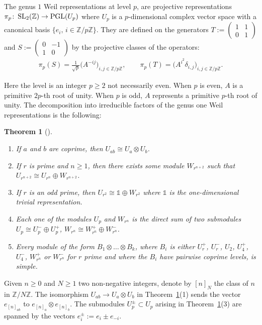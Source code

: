 \documentclass[pdftex]{sigma}
\numberwithin{equation}{section}
\newtheorem{Theorem}{Theorem}[section]
\begin{document}
The genus $1$ Weil representations at level $p$, are projective representations $\pi_p \colon \operatorname{SL}_2(\mathbb{Z}) \rightarrow \operatorname{PGL}(U_p)$ where $U_p$ is a $p$-dimensional complex vector space with a canonical basis $\{e_i, \, i \in \mathbb{Z}/p\mathbb{Z} \}$. They are defined on the generators $T:= \left(\begin{smallmatrix} 1&1\\0&1 \end{smallmatrix}\right)$ and $S:=\left(\begin{smallmatrix} 0& -1 \\ 1&0 \end{smallmatrix}\right)$ by the projective classes of the operators:
 \begin{gather*}
\pi_p (S) = \frac{1}{\sqrt{p}} \big( A^{-ij}\big)_{i,j \in \mathbb{Z}/p\mathbb{Z}},\qquad
\pi_p(T) = \big( A^{i^2}\delta_{i,j} \big)_{i,j \in \mathbb{Z}/p\mathbb{Z}}.
\end{gather*}

 Here the level is an integer $p\geq 2$ not necessarily even. When $p$ is even, $A$ is a primitive $2p$-{th} root of unity. When $p$ is odd, $A$ represents a primitive $p$-{th} root of unity. The decomposition into irreducible factors of the genus one Weil representations is the following:

\begin{Theorem}[{\cite[Theorem ~1.1]{Koju1}}] \label{th_weil}\quad
\begin{enumerate}\itemsep=0pt
\item[$1.$] If $a$ and $b$ are coprime, then $U_{ab}\cong U_a \otimes U_b$.
\item[$2.$] If $r$ is prime and $n\geq 1$, then there exists some module $W_{r^{n+2}}$ such that $U_{r^{n+2}}\cong U_{r^n}\oplus W_{r^{n+2}}$.
\item[$3.$] If $r$ is an odd prime, then $U_{r^2}\cong \mathds{1}\oplus W_{r^2}$ where $\mathds{1}$ is the one-dimensional trivial representation.
\item[$4.$] Each one of the modules $U_p$ and $W_{r^n}$ is the direct sum of two submodules $U_p\cong U_p^-\oplus U_p^+$, $W_{r^n}\cong W_{r^n}^+\oplus W_{r^n}^-$.
\item[$5.$] Every module of the form $B_{1}\otimes \dots \otimes B_{k}$, where $B_{i}$ is either $U_{r}^+$, $U_{r}^-$, $U_2$, $U_4^+$, $U_4^-$, $W_{r^n}^+$ or $W_{r^n}^-$ for $r$ prime and where the $B_i$ have pairwise coprime levels, is simple.
\end{enumerate}
\end{Theorem}
Given $n\geq0$ and $N\geq 1$ two non-negative integers, denote by $[n]_N$ the class of $n$ in $\mathbb{Z}/N\mathbb{Z}$. The isomorphism $U_{ab}\rightarrow U_a\otimes U_b$ in Theorem~\ref{th_weil}(1) sends the vector $e_{[n]_{ab}}$ to $e_{[n]_a}\otimes e_{[n]_b}$. The submodules $U_p^{\pm}\subset U_p$ arising in Theorem~\ref{th_weil}(3) are spanned by the vectors $e_i^{\pm}:= e_i \pm e_{-i}$.
\end{document}
